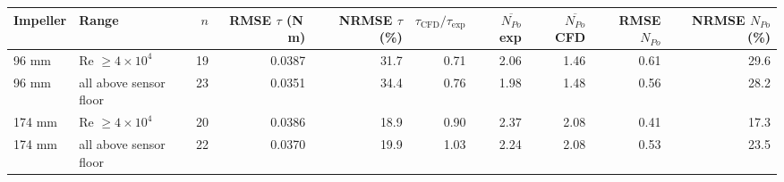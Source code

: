 \begin{tabular}{@{}llrrrrrrrr@{}}
\toprule
Impeller & Range & $n$ & RMSE $\tau$ (N\,m) & NRMSE $\tau$ (\%) & $\tau_{\mathrm{CFD}}/\tau_{\mathrm{exp}}$ & $\overline{N_{Po}}$ exp & $\overline{N_{Po}}$ CFD & RMSE $N_{Po}$ & NRMSE $N_{Po}$ (\%) \\
\midrule
96 mm & Re $\geq 4\times10^{4}$ & 19 & 0.0387 & 31.7 & 0.71 & 2.06 & 1.46 & 0.61 & 29.6 \\
96 mm & all above sensor floor & 23 & 0.0351 & 34.4 & 0.76 & 1.98 & 1.48 & 0.56 & 28.2 \\
174 mm & Re $\geq 4\times10^{4}$ & 20 & 0.0386 & 18.9 & 0.90 & 2.37 & 2.08 & 0.41 & 17.3 \\
174 mm & all above sensor floor & 22 & 0.0370 & 19.9 & 1.03 & 2.24 & 2.08 & 0.53 & 23.5 \\
\bottomrule
\end{tabular}
